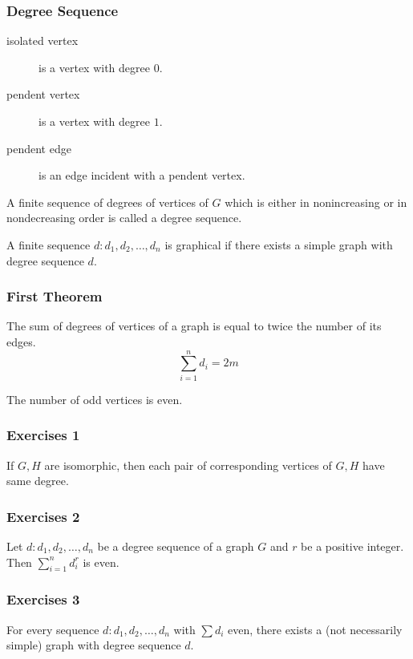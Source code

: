 \documentclass{beamer}
\begin{document}
\begin{frame}
\frametitle{Degree Sequence}
\begin{description}
	\item[isolated vertex] is a vertex with degree $0$.
	\item[pendent vertex] is a vertex with degree $1$.
	\item[pendent edge] is an edge incident with a pendent vertex.
\end{description}
\begin{definition}
	A finite sequence of degrees of vertices of $G$ which is either in nonincreasing or in nondecreasing order is called a degree sequence.
\end{definition}

\begin{definition}
	A finite sequence $d : d_1,d_2,\dots,d_n$ is graphical if there exists a simple graph with degree sequence $d$.
\end{definition}
\end{frame}

\begin{frame}
\frametitle{First Theorem}
\begin{theorem}[Euler]
	The sum of degrees of  vertices of a graph is equal to twice the number of its edges.
	$$ \sum_{i = 1}^n d_i = 2m $$
\end{theorem}

\begin{corollary}
	The number of odd vertices is even.
\end{corollary}
\end{frame}

\begin{frame}
\frametitle{Exercises 1}
	If $G,H$ are isomorphic, then each pair of corresponding vertices of $G,H$ have same degree.
\end{frame}

\begin{frame}
\frametitle{Exercises 2}
	Let $d : d_1,d_2,\dots,d_n$ be a degree sequence of a graph $G$ and $r$ be a positive integer. Then $\sum_{i = 1}^n d_i^r$ is even.
\end{frame}

\begin{frame}
\frametitle{Exercises 3}
	For every sequence $d : d_1,d_2,\dots,d_n$ with $\sum d_i$ even, there exists a (not necessarily simple) graph with degree sequence $d$.
\end{frame}
\end{document}
